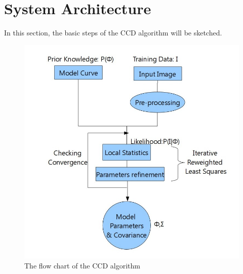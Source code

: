 \documentclass[conference]{IEEEtran}
\begin{document}
\section{System Architecture}
In this section, the basic steps of the CCD algorithm will be
sketched. 
\begin{figure}[htb]
  \centering
  \includegraphics[width=\columnwidth]{images/flowchart.jpg}
  \caption[The flow chart of
  the CCD algorithm]{The flow chart of the CCD algorithm}
  \label{fig:flowchart}
\end{figure}
\end{document}
